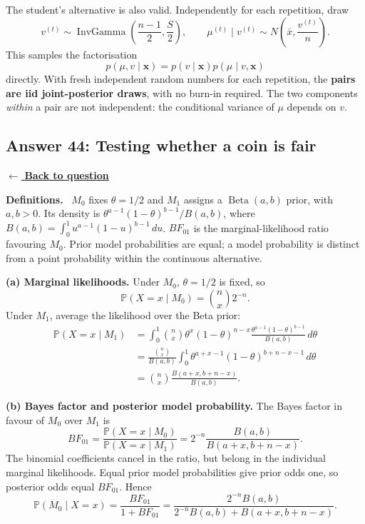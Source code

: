 \documentclass[11pt,a4paper]{article}
\newcommand{\given}{\mathrel{|}}
\newcommand{\xvec}{\boldsymbol{x}}
\DeclareMathOperator{\InvGamma}{InvGamma}
\newcommand{\answernav}[1]{%
  \label{answer:#1}%
  \noindent\hyperref[question:#1]{$\leftarrow$ \textbf{Back to question}}%
  \par\smallskip}
\newcommand{\studyheading}[1]{%
  \par\medskip\noindent\textcolor{statblue}{\textbf{#1.}}\ }
\begin{document}
The student's alternative is also valid. Independently for each repetition,
draw
\[
v^{(t)}\sim\InvGamma\!\left(\frac{n-1}{2},\frac S2\right),
\qquad
\mu^{(t)}\given v^{(t)}\sim N\!\left(\bar x,\frac{v^{(t)}}n\right).
\]
This samples the factorisation
\[
p(\mu,v\given\xvec)=p(v\given\xvec)p(\mu\given v,\xvec)
\]
directly. With fresh independent random numbers for each repetition,
the \textbf{pairs are iid joint-posterior draws}, with no burn-in required.
The two components \emph{within} a pair are not independent: the
conditional variance of $\mu$ depends on $v$.

\clearpage

\subsection{Answer 44: Testing whether a coin is fair}
\answernav{44}

\studyheading{Definitions}
$M_0$ fixes $\theta=1/2$ and $M_1$ assigns a $\operatorname{Beta}(a,b)$ prior, with $a,b>0$.
Its density is $\theta^{a-1}(1-\theta)^{b-1}/B(a,b)$, where
$B(a,b)=\int_0^1u^{a-1}(1-u)^{b-1}\,du$.
$BF_{01}$ is the marginal-likelihood ratio favouring $M_0$.
Prior model probabilities are equal; a model probability is distinct from a point probability within the continuous alternative.

\textbf{(a) Marginal likelihoods.}
Under $M_0$, $\theta=1/2$ is fixed, so
\[
\boxed{\mathbb{P}(X=x\given M_0)=\binom nx2^{-n}.}
\]
Under $M_1$, average the likelihood over the Beta prior:
\begin{align*}
\mathbb{P}(X=x\given M_1)
&=\int_0^1\binom nx\theta^x(1-\theta)^{n-x}
\frac{\theta^{a-1}(1-\theta)^{b-1}}{B(a,b)}\,d\theta\\
&=\frac{\binom nx}{B(a,b)}
\int_0^1\theta^{a+x-1}(1-\theta)^{b+n-x-1}\,d\theta\\
&=\boxed{\binom nx\frac{B(a+x,b+n-x)}{B(a,b)}}.
\end{align*}

\textbf{(b) Bayes factor and posterior model probability.}
The Bayes factor in favour of $M_0$ over $M_1$ is
\[
\boxed{
BF_{01}
=\frac{\mathbb{P}(X=x\given M_0)}{\mathbb{P}(X=x\given M_1)}
=2^{-n}\frac{B(a,b)}{B(a+x,b+n-x)}.
}
\]
The binomial coefficients cancel in the ratio, but belong in the individual
marginal likelihoods. Equal prior model probabilities give prior odds one,
so posterior odds equal $BF_{01}$. Hence
\[
\boxed{
\mathbb{P}(M_0\given X=x)
=\frac{BF_{01}}{1+BF_{01}}
=\frac{2^{-n}B(a,b)}{2^{-n}B(a,b)+B(a+x,b+n-x)}.
}
\]
\end{document}
